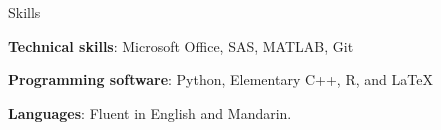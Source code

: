 \documentclass[
	11pt, %
]{resume} %
\begin{document}
	


\begin{rSection}{Skills}

	\item \textbf{Technical skills}: Microsoft Office, SAS, MATLAB, Git
	\item \textbf{Programming software}: Python, Elementary C++, R, and \LaTeX
	\item \textbf{Languages}: Fluent in English and Mandarin.
\end{rSection}






\end{document}
